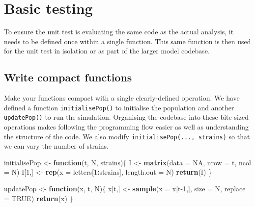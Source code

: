 \documentclass[10pt,letterpaper]{article}
\newenvironment{Shaded}{\begin{snugshade}}{\end{snugshade}}
\newcommand{\ControlFlowTok}[1]{\textcolor[rgb]{0.13,0.29,0.53}{\textbf{#1}}}
\newcommand{\DataTypeTok}[1]{\textcolor[rgb]{0.13,0.29,0.53}{#1}}
\newcommand{\DecValTok}[1]{\textcolor[rgb]{0.00,0.00,0.81}{#1}}
\newcommand{\KeywordTok}[1]{\textcolor[rgb]{0.13,0.29,0.53}{\textbf{#1}}}
\newcommand{\NormalTok}[1]{#1}
\newcommand{\OperatorTok}[1]{\textcolor[rgb]{0.81,0.36,0.00}{\textbf{#1}}}
\newcommand{\OtherTok}[1]{\textcolor[rgb]{0.56,0.35,0.01}{#1}}
\newcommand{\StringTok}[1]{\textcolor[rgb]{0.31,0.60,0.02}{#1}}
\begin{document}
\hypertarget{basic-testing}{%
\section{Basic testing}\label{basic-testing}}

To ensure the unit test is evaluating the same code as the actual analysis, it needs to be defined once within a single function.
This same function is then used for the unit test in isolation or as part of the larger model codebase.

\hypertarget{compactfuns}{%
\subsection*{Write compact functions}\label{compactfuns}}

Make your functions compact with a single clearly-defined operation.
We have defined a function \texttt{initialisePop()} to initialise the population and another \texttt{updatePop()} to run the simulation.
Organising the codebase into these bite-sized operations makes following the programming flow easier as well as understanding the structure of the code.
We also modify \texttt{initialisePop(...,\ strains)} so that we can vary the number of strains.
\newline
{}\label{compactfunctions}

\begin{Shaded}
\begin{Highlighting}[]
\NormalTok{initialisePop <-}\StringTok{ }\ControlFlowTok{function}\NormalTok{(t, N, strains)\{}
\NormalTok{  I <-}\StringTok{ }\KeywordTok{matrix}\NormalTok{(}\DataTypeTok{data =} \OtherTok{NA}\NormalTok{, }\DataTypeTok{nrow =}\NormalTok{ t, }\DataTypeTok{ncol =}\NormalTok{ N)}
\NormalTok{  I[}\DecValTok{1}\NormalTok{,] <-}\StringTok{ }\KeywordTok{rep}\NormalTok{(}\DataTypeTok{x =}\NormalTok{ letters[}\DecValTok{1}\OperatorTok{:}\NormalTok{strains], }\DataTypeTok{length.out =}\NormalTok{ N)}
  \KeywordTok{return}\NormalTok{(I)}
\NormalTok{\}}

\NormalTok{updatePop <-}\StringTok{ }\ControlFlowTok{function}\NormalTok{(x, t, N)\{}
\NormalTok{  x[t,] <-}\StringTok{ }\KeywordTok{sample}\NormalTok{(}\DataTypeTok{x =}\NormalTok{ x[t}\DecValTok{-1}\NormalTok{,], }\DataTypeTok{size =}\NormalTok{ N, }\DataTypeTok{replace =} \OtherTok{TRUE}\NormalTok{)}
  \KeywordTok{return}\NormalTok{(x)}
\NormalTok{\}}
\end{Highlighting}
\end{Shaded}
\end{document}
